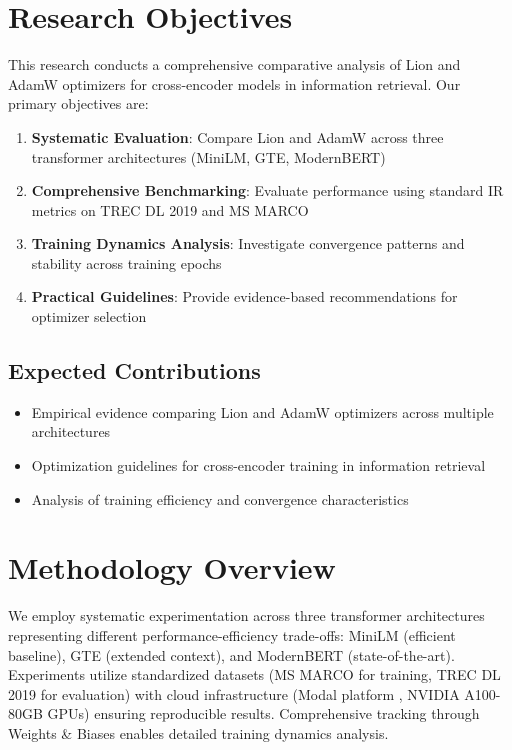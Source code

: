 \section{Research Objectives}

This research conducts a comprehensive comparative analysis of Lion and AdamW optimizers for cross-encoder models in information retrieval. Our primary objectives are:

\begin{enumerate}
    \item \textbf{Systematic Evaluation}: Compare Lion and AdamW across three transformer architectures (MiniLM, GTE, ModernBERT)
    \item \textbf{Comprehensive Benchmarking}: Evaluate performance using standard IR metrics on TREC DL 2019 and MS MARCO
    \item \textbf{Training Dynamics Analysis}: Investigate convergence patterns and stability across training epochs
    \item \textbf{Practical Guidelines}: Provide evidence-based recommendations for optimizer selection
\end{enumerate}

\subsection{Expected Contributions}
\begin{itemize}
\item Empirical evidence comparing Lion and AdamW optimizers across multiple architectures
\item Optimization guidelines for cross-encoder training in information retrieval
\item Analysis of training efficiency and convergence characteristics
\end{itemize}

\section{Methodology Overview}

We employ systematic experimentation across three transformer architectures representing different performance-efficiency trade-offs: MiniLM (efficient baseline), GTE (extended context), and ModernBERT (state-of-the-art). Experiments utilize standardized datasets (MS MARCO \cite{DBLP:journals/corr/NguyenRSGTMD16} for training, TREC DL 2019 \cite{craswell2020overview} for evaluation) with cloud infrastructure (Modal platform \cite{modal_labs}, NVIDIA A100-80GB GPUs) ensuring reproducible results. Comprehensive tracking through Weights \& Biases \cite{wandb2020} enables detailed training dynamics analysis.

